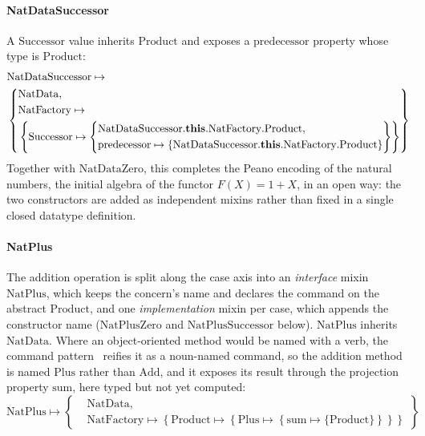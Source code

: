 \paragraph{NatDataSuccessor}
A $\mathrm{Successor}$ value inherits $\mathrm{Product}$ and
exposes a $\mathrm{predecessor}$ property whose type is $\mathrm{Product}$:
\[
  \begin{aligned}
    &\mathrm{NatDataSuccessor} \mapsto \\
    &\left\{
    \begin{aligned}
      &\mathrm{NatData},\\
      &\mathrm{NatFactory} \mapsto \\
      &\left\{\mathrm{Successor} \mapsto \left\{
        \begin{aligned}
          &\mathrm{NatDataSuccessor}.\mathbf{this}.\mathrm{NatFactory}.\mathrm{Product},\\
          &\mathrm{predecessor} \mapsto \{\mathrm{NatDataSuccessor}.\mathbf{this}.\mathrm{NatFactory}.\mathrm{Product}\}
      \end{aligned}\right\}\right\}
  \end{aligned}\right\}
  \end{aligned}
\]
Together with $\mathrm{NatDataZero}$, this completes the Peano encoding of
the natural numbers, the initial algebra of the functor $F(X) = 1 + X$,
in an open way: the two constructors are added as independent mixins
rather than fixed in a single closed datatype definition.

\paragraph{NatPlus}
The addition operation is split along the case axis into an \emph{interface}
mixin $\mathrm{NatPlus}$, which keeps the concern's name and declares the command
on the abstract $\mathrm{Product}$, and one \emph{implementation} mixin per case,
which appends the constructor name ($\mathrm{NatPlusZero}$ and
$\mathrm{NatPlusSuccessor}$ below). $\mathrm{NatPlus}$ inherits
$\mathrm{NatData}$. Where an
object-oriented method would be named with a verb, the command
pattern~\cite{gamma1994-design-patterns} reifies it as a noun-named command, so
the addition method is named $\mathrm{Plus}$ rather than $\mathrm{Add}$, and it
exposes its result through the projection property $\mathrm{sum}$, here typed but
not yet computed:
\[
  \mathrm{NatPlus} \mapsto \left\{
    \begin{aligned}
      &\mathrm{NatData},\\
      &\mathrm{NatFactory} \mapsto \left\{\mathrm{Product} \mapsto \left\{\mathrm{Plus} \mapsto \left\{\mathrm{sum} \mapsto \{\mathrm{Product}\}\right\}\right\}\right\}
  \end{aligned}\right\}
\]

